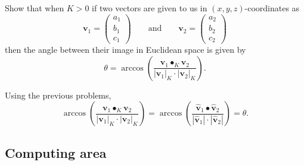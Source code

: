 \documentclass[newpage,hints,handout]{ximera}
\begin{document}
\begin{problem}
  Show that when $K>0$ if two vectors are given to us in $(x,y,z)$-coordinates as
  \[
  \mathbf{v}_{1}=\begin{pmatrix}a_{1} \\ b_{1} \\ c_{1}\end{pmatrix}
  \qquad\text{and}\qquad
  \mathbf{v}_{2} =\begin{pmatrix}a_{2} \\ b_{2} \\ c_{2}\end{pmatrix}
  \]
  then the angle between their image in Euclidean space is given by
  \[
  \theta = \arccos\left(\frac{\mathbf{v}_1\bullet_K \mathbf{v}_2}{|\mathbf{v}_1|_K \cdot|\mathbf{v}_2|_K }\right).
  \]


\begin{freeResponse} Using the previous problems,
\[
\arccos\left(\frac{\mathbf{v}_1\bullet_K \mathbf{v}_2}{\left| \mathbf{v}_1\right|_K \cdot\left|\mathbf{v}_2\right|_K }\right) = \arccos\left(\frac{\hat{\mathbf v}_{1}\bullet \hat{\mathbf v}_{2}}{\left| \hat{\mathbf v}_{1}\right| \cdot\left|\hat{\mathbf v}_{2}\right| }\right) = \theta.
\]
\end{freeResponse}
\end{problem}




\subsection{Computing area}
\end{document}
